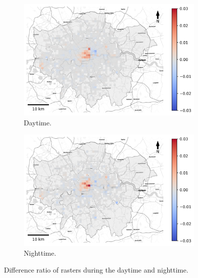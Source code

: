 \documentclass{article}
\theoremstyle{remark}
\begin{document}
\begin{figure}[!h]

\begin{subfigure}{0.5\textwidth}
\includegraphics[width=1\linewidth]{figures/raster_diff_daytime.png} 
\caption{Daytime.}
\label{fig:raster_diff_daytime}
\end{subfigure}
\begin{subfigure}{0.5\textwidth}
\includegraphics[width=1\linewidth]{figures/raster_diff_nighttime.png}
\caption{Nighttime.}
\label{fig:raster_diff_nighttime}
\end{subfigure}

\caption{Difference ratio of rasters during the daytime and nighttime.} \label{fig:raster_diff_day}
\end{figure}
\end{document}
